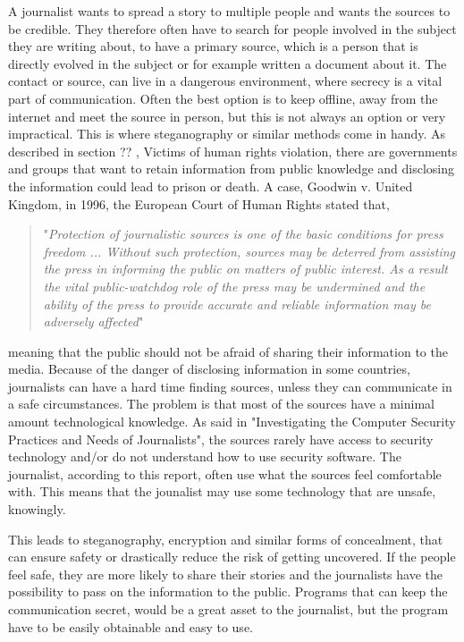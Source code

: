 A journalist wants to spread a story to multiple people and wants the sources to be credible. They therefore often have to search for people involved in the subject they are writing about, to have a primary source, which is a person that is directly evolved in the subject or for example written a document about it. The contact or source, can live in a dangerous environment, where secrecy is a vital part of communication. Often the best option is to keep offline, away from the internet and meet the source in person, but this is not always an option or very impractical.\cite{secret} This is where steganography or similar methods come in handy. As described in section ?? , Victims of human rights violation, there are governments and groups that want to retain information from public knowledge and disclosing the information could lead to prison or death. A case, Goodwin v. United Kingdom, in 1996, the European Court of Human Rights stated that, 

\begin{quote}
"\emph{Protection of journalistic sources is one of the basic conditions for press freedom ... Without such protection, sources may be deterred from assisting the press in informing the public on matters of public interest. As a result the vital public-watchdog role of the press may be undermined and the ability of the press to provide accurate and reliable information may be adversely affected}"\cite{case}
\end{quote}

meaning that the public should not be afraid of sharing their information to the media. Because of the danger of disclosing information in some countries, journalists can have a hard time finding sources, unless they can communicate in a safe circumstances. The problem is that most of the sources have a minimal amount technological knowledge. As said in "Investigating the Computer Security Practices and Needs of Journalists", the sources rarely have access to security technology and/or do not understand how to use security software. The journalist, according to this report, often use what the sources feel comfortable with. This means that the jounalist may use some technology that are unsafe, knowingly.\cite{journalists}

This leads to steganography, encryption and similar forms of concealment, that can ensure safety or drastically reduce the risk of getting uncovered. If the people feel safe, they are more likely to share their stories and the journalists have the possibility to pass on the information to the public. Programs that can keep the communication secret, would be a great asset to the journalist, but the program have to be easily obtainable and easy to use.